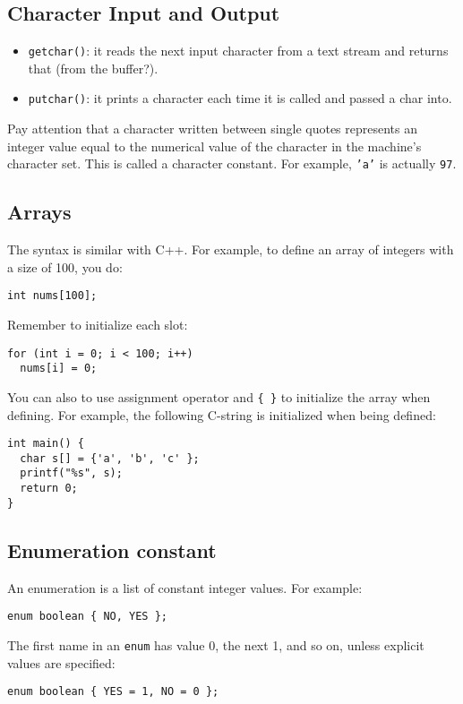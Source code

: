 \documentclass[12pt]{article}
\begin{document}
\subsection{Character Input and Output}
\label{sec:orga0464c8}
\begin{itemize}
\item \texttt{getchar()}: it reads the next input character from a text stream and returns that (from the buffer?).
\item \texttt{putchar()}: it prints a character each time it is called and passed a char into.
\end{itemize}

Pay attention that a character written between single quotes represents an integer value equal to the numerical value of the character in the machine's character set. This is called a character constant. For example, \texttt{'a'} is actually \texttt{97}.
\subsection{Arrays}
\label{sec:org1313ce9}
The syntax is similar with C++. For example, to define an array of integers with a size of 100, you do:
\begin{verbatim}
int nums[100];
\end{verbatim}
Remember to initialize each slot:
\begin{verbatim}
for (int i = 0; i < 100; i++)
  nums[i] = 0;
\end{verbatim}

You can also to use assignment operator and \texttt{\{ \}} to initialize the array when defining. For example, the following C-string is initialized when being defined:
\begin{verbatim}
int main() {
  char s[] = {'a', 'b', 'c' };
  printf("%s", s);
  return 0;
}
\end{verbatim}
\subsection{Enumeration constant}
\label{sec:org43bfe38}
An enumeration is a list of constant integer values. For example:
\begin{verbatim}
enum boolean { NO, YES };
\end{verbatim}
The first name in an \texttt{enum} has value 0, the next 1, and so on, unless explicit values are specified:
\begin{verbatim}
enum boolean { YES = 1, NO = 0 };
\end{verbatim}
\end{document}
